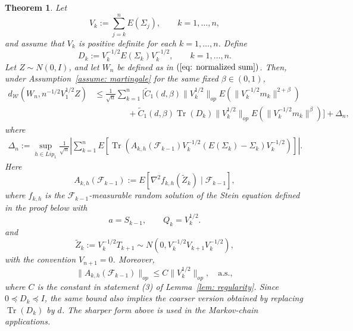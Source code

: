 \documentclass[11pt]{article}
\newtheorem{theorem}{Theorem}
\begin{document}
\begin{theorem}\label{thm: martingale CLT}
Let
\[
    V_k:=\sum_{j=k}^n E(\Sigma_j),
    \qquad k=1,\ldots,n,
\]
and assume that \(V_k\) is positive definite for each \(k=1,\ldots,n\).  Define
\[
    D_k:=V_k^{-1/2}E(\Sigma_k)V_k^{-1/2},
    \qquad k=1,\ldots,n .
\]
Let \(Z\sim N(0,I)\), and let \(W_n\) be defined as in
\((\ref{eq: normalized sum})\). Then, under
Assumption~\ref{assume: martingale} for the same fixed \(\beta\in(0,1)\),
\begin{align*}
   d_{\mathcal W}(W_n,n^{-1/2}V_1^{1/2}Z)
   &\le
   \frac{1}{\sqrt n}\sum_{k=1}^n
   \Biggl[
   \tilde C_1(d,\beta)\|V_k^{1/2}\|_{op}
   E\left(\|V_k^{-1/2}m_k\|^{2+\beta}\right)
   \\
   &\qquad\qquad
   +
   \tilde C_1(d,\beta)\operatorname{Tr}(D_k)\|V_k^{1/2}\|_{op}
   E\left(\|V_k^{-1/2}m_k\|^\beta\right)
   \Biggr]
   +\Delta_n,
\end{align*}
where
\begin{align*}
\Delta_n
:=
\sup_{h\in Lip_1}
\frac{1}{\sqrt n}
\left|
\sum_{k=1}^n
E\left[
\operatorname{Tr}\left(
A_{k,h}(\mathcal F_{k-1})
V_k^{-1/2}
\left(E(\Sigma_k)-\Sigma_k\right)
V_k^{-1/2}
\right)
\right]
\right|.
\end{align*}
Here
\[
A_{k,h}(\mathcal F_{k-1})
:=
E\left[
\nabla^2 f_{k,h}(\widetilde Z_k)
\mid
\mathcal F_{k-1}
\right],
\]
where \(f_{k,h}\) is the $\mathcal F_{k-1}$-measurable random solution of
the Stein equation defined in the proof below with
\[
    a=S_{k-1},
    \qquad
    Q_k=V_k^{1/2}.
\]
and
\[
    \widetilde Z_k
    :=
    V_k^{-1/2}T_{k+1}
    \sim
    N\left(0,V_k^{-1/2}V_{k+1}V_k^{-1/2}\right),
\]
with the convention \(V_{n+1}=0\). Moreover,
\[
    \|A_{k,h}(\mathcal F_{k-1})\|_{op}
    \le
    C\|V_k^{1/2}\|_{op}, \quad \text{a.s.},
\]
where \(C\) is the constant in statement (3) of Lemma~\ref{lem: regularity}.
Since \(0\preceq D_k\preceq I\), the same bound also implies the coarser
version obtained by replacing \(\operatorname{Tr}(D_k)\) by \(d\).  The sharper
form above is used in the Markov-chain applications.
\end{theorem}
\end{document}
